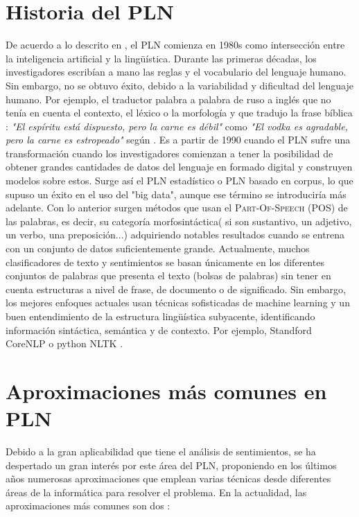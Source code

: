\section{Historia del PLN}
De acuerdo a lo descrito en \citet{hirschberg2015advances}, el PLN comienza en 1980s como intersección entre la inteligencia artificial y la lingüística.  
Durante las primeras décadas, los investigadores escribían a mano las reglas y el vocabulario del lenguaje humano. Sin embargo, no se obtuvo éxito, debido a la variabilidad y dificultad del lenguaje humano. Por ejemplo, el traductor palabra a palabra de ruso a inglés que no tenía en cuenta el contexto, el léxico o la morfología y que tradujo la frase bíblica : \textsl{"El espíritu está dispuesto, pero la carne es débil"} como \textsl{"El vodka es agradable, pero la carne es
estropeado"} según \citet{nadkarni2011natural}. \newline
Es a partir de 1990 cuando el PLN sufre una transformación cuando los investigadores comienzan a tener la posibilidad de obtener grandes cantidades de datos del lenguaje en formado digital y construyen modelos sobre estos. Surge así el PLN estadístico o PLN basado en corpus, lo que supuso un éxito en el uso del "big data", aunque ese término se introduciría más adelante. Con lo anterior surgen métodos que usan el \textsc{Part-Of-Speech} (POS) de las palabras, es decir, su categoría morfosintáctica( si son sustantivo, un adjetivo, un verbo, una preposición...) adquiriendo notables resultados cuando se entrena con un conjunto de datos suficientemente grande. \newline
Actualmente, muchos clasificadores de texto y sentimientos se basan únicamente en los diferentes conjuntos de palabras que presenta el texto (bolsas de palabras) sin tener en cuenta estructuras a nivel de frase, de documento o de significado. Sin embargo, los mejores enfoques actuales usan técnicas sofisticadas de machine learning y un buen entendimiento de la estructura lingüística subyacente, identificando información sintáctica, semántica y de contexto. Por ejemplo, Standford CoreNLP \citet{manning2014stanford} o python NLTK \citet{bird2006nltk}. 

\section{Aproximaciones más comunes en PLN} 
Debido a la gran aplicabilidad que tiene el análisis de sentimientos, se ha despertado un gran interés 
por este área del PLN, proponiendo en los últimos años numerosas aproximaciones que emplean varias técnicas desde diferentes áreas de la informática para resolver el problema. \newline
En la actualidad, las aproximaciones más comunes son dos \citet{ribeiro2016sentibench}: 
